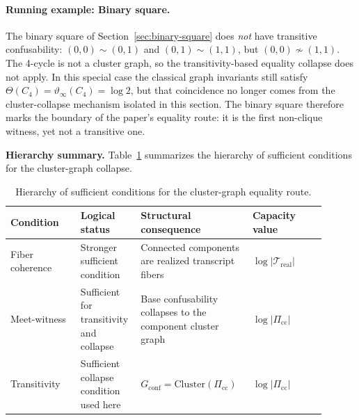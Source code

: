 \paragraph{Running example: Binary square.}
The binary square of Section~\ref{sec:binary-square} does \emph{not} have transitive confusability: $(0,0) \sim (0,1)$ and $(0,1) \sim (1,1)$, but $(0,0) \not\sim (1,1)$. The 4-cycle is not a cluster graph, so the transitivity-based equality collapse does not apply. In this special case the classical graph invariants still satisfy $\Theta(C_4)=\vartheta_\infty(C_4)=\log 2$, but that coincidence no longer comes from the cluster-collapse mechanism isolated in this section. The binary square therefore marks the boundary of the paper's equality route: it is the first non-clique witness, yet not a transitive one.

\medskip
\noindent\textbf{Hierarchy summary.} Table~\ref{tab:equality-hierarchy} summarizes the hierarchy of sufficient conditions for the cluster-graph collapse.

\begin{table}[t]
\centering
\begingroup
\small
\setlength{\tabcolsep}{4pt}
\renewcommand{\arraystretch}{1.1}
\renewcommand{\tabularxcolumn}[1]{m{#1}}
\begin{tabularx}{0.98\linewidth}{@{}>{\RaggedRight\arraybackslash}m{0.21\linewidth}>{\RaggedRight\arraybackslash}m{0.16\linewidth}>{\RaggedRight\arraybackslash}m{0.31\linewidth}>{\RaggedRight\arraybackslash}m{0.22\linewidth}@{}}
\toprule
\textbf{Condition} & \textbf{Logical status} & \textbf{Structural consequence} & \textbf{Capacity value} \\
\midrule
Fiber coherence & Stronger sufficient condition & Connected components are realized transcript fibers & $\log |\mathcal T_{\mathrm{real}}|$ \\
\midrule
Meet-witness & Sufficient for transitivity and collapse & Base confusability collapses to the component cluster graph & $\log |\Pi_{\mathrm{cc}}|$ \\
\midrule
Transitivity & Sufficient collapse condition used here & $G_{\mathrm{conf}}=\mathrm{Cluster}(\Pi_{\mathrm{cc}})$ & $\log |\Pi_{\mathrm{cc}}|$ \\
\bottomrule
\end{tabularx}
\endgroup
\caption{Hierarchy of sufficient conditions for the cluster-graph equality route.}
\label{tab:equality-hierarchy}
\end{table}
